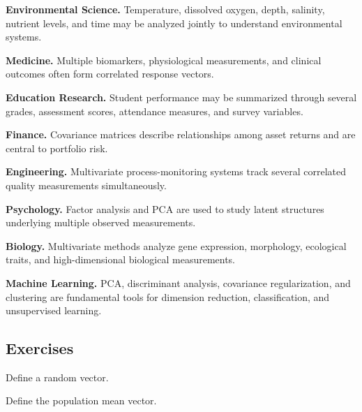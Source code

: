 \begin{applicationbox}

\textbf{Environmental Science.}
Temperature, dissolved oxygen, depth, salinity, nutrient levels, and time
may be analyzed jointly to understand environmental systems.

\medskip

\textbf{Medicine.}
Multiple biomarkers, physiological measurements, and clinical outcomes
often form correlated response vectors.

\medskip

\textbf{Education Research.}
Student performance may be summarized through several grades, assessment
scores, attendance measures, and survey variables.

\medskip

\textbf{Finance.}
Covariance matrices describe relationships among asset returns and are
central to portfolio risk.

\medskip

\textbf{Engineering.}
Multivariate process-monitoring systems track several correlated quality
measurements simultaneously.

\medskip

\textbf{Psychology.}
Factor analysis and PCA are used to study latent structures underlying
multiple observed measurements.

\medskip

\textbf{Biology.}
Multivariate methods analyze gene expression, morphology, ecological
traits, and high-dimensional biological measurements.

\medskip

\textbf{Machine Learning.}
PCA, discriminant analysis, covariance regularization, and clustering are
fundamental tools for dimension reduction, classification, and
unsupervised learning.

\end{applicationbox}

\subsection{Exercises}
\label{subsec:multivariate-exercises}

\begin{exercise}[1]
Define a random vector.
\end{exercise}

\begin{exercise}[1]
Define the population mean vector.
\end{exercise}

